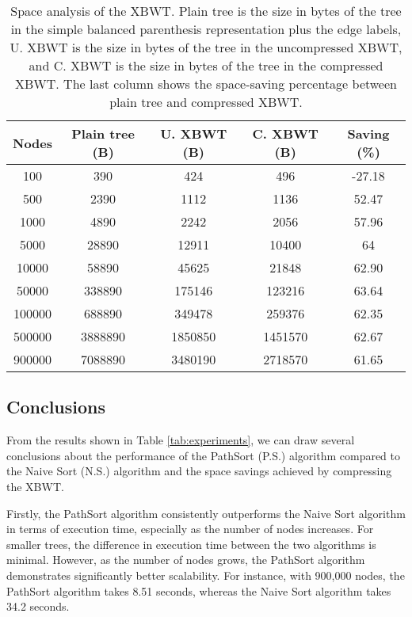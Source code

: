 \begin{table}[ht]
    \centering
    \begin{tabular}{|c|c|c|c|c|}
        \hline
        \textbf{Nodes} & \textbf{Plain tree (B)} & \textbf{U. XBWT (B)} & \textbf{C. XBWT (B)} & \textbf{Saving (\%)} \\
        \hline
        100 & 390 & 424 & 496 & -27.18 \\
        500 & 2390 & 1112 & 1136 & 52.47 \\
        1000 & 4890 & 2242 & 2056 & 57.96 \\
        5000 & 28890 & 12911 & 10400 & 64 \\
        10000 & 58890 & 45625 & 21848 & 62.90 \\
        50000 & 338890 & 175146 & 123216 & 63.64 \\
        100000 & 688890 & 349478 & 259376 & 62.35 \\
        500000 & 3888890 & 1850850 & 1451570 & 62.67 \\
        900000 & 7088890 & 3480190 & 2718570 & 61.65 \\
        \hline
    \end{tabular}
    \caption{Space analysis of the XBWT. Plain tree is the size in bytes of the tree in the simple balanced parenthesis representation plus the edge labels, U. XBWT is the size in bytes of the tree in the uncompressed XBWT, and C. XBWT is the size in bytes of the tree in the compressed XBWT. The last column shows the space-saving percentage between plain tree and compressed XBWT.}
    \label{tab:experiments_2}
\end{table}

\subsection{Conclusions}
From the results shown in Table \ref{tab:experiments}, we can draw several conclusions about the performance of the PathSort (P.S.) algorithm compared to the Naive Sort (N.S.) algorithm and the space savings achieved by compressing the XBWT.

Firstly, the PathSort algorithm consistently outperforms the Naive Sort algorithm in terms of execution time, especially as the number of nodes increases. For smaller trees, the difference in execution time between the two algorithms is minimal. However, as the number of nodes grows, the PathSort algorithm demonstrates significantly better scalability. For instance, with 900,000 nodes, the PathSort algorithm takes 8.51 seconds, whereas the Naive Sort algorithm takes 34.2 seconds.


